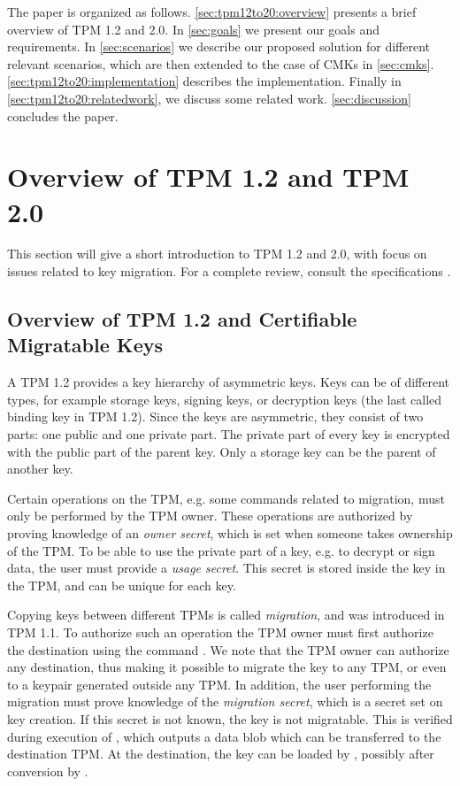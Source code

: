 {The paper is organized as follows. \autoref{sec:tpm12to20:overview} presents a brief overview of TPM 1.2 and 2.0. In \autoref{sec:goals} we present our goals and requirements. In \autoref{sec:scenarios} we describe our proposed solution for different relevant scenarios, which are then extended to the case of CMKs in \autoref{sec:cmks}. \autoref{sec:tpm12to20:implementation} describes the implementation. Finally in \autoref{sec:tpm12to20:relatedwork}, we discuss some related work. \autoref{sec:discussion} concludes the paper.

\section{Overview of TPM 1.2 and TPM 2.0} \label{sec:tpm12to20:overview}
This section will give a short introduction to TPM 1.2 and 2.0, with focus on issues related to key migration. For a complete review, consult the specifications \cite{TPM1.2spec,TPM2.0r16}.

\subsection{Overview of TPM 1.2 and Certifiable Migratable Keys}
A TPM 1.2 provides a key hierarchy of asymmetric keys. Keys can be of different types, for example storage keys, signing keys, or decryption keys (the last called binding key in TPM 1.2). Since the keys are asymmetric, they consist of two parts: one public and one private part. The private part of every key is encrypted with the public part of the parent key. Only a storage key can be the parent of another key.

Certain operations on the TPM, e.g. some commands related to migration, must only be performed by the TPM owner. These operations are authorized by proving knowledge of an \emph{owner secret}, which is set when someone takes ownership of the TPM. To be able to use the private part of a key, e.g. to decrypt or sign data, the user must provide a \emph{usage secret}. This secret is stored inside the key in the TPM, and can be unique for each key.

Copying keys between different TPMs is called \emph{migration}, and was introduced in TPM 1.1\cite{TPM1.1bspec}. To authorize such an operation the TPM owner must first authorize the destination using the command . We note that the TPM owner can authorize any destination, thus making it possible to migrate the key to any TPM, or even to a keypair generated outside any TPM. In addition, the user performing the migration must prove knowledge of the \emph{migration secret}, which is a secret set on key creation. If this secret is not known, the key is not migratable. This is verified during execution of , which outputs a data blob which can be transferred to the destination TPM. At the destination, the key can be loaded by , possibly after conversion by .

}
